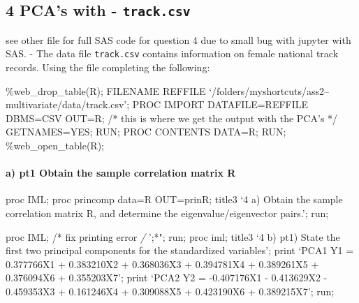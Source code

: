 \documentclass[11pt]{article}
\begin{document}
    \hypertarget{pcas-with---track.csv}{%
\subsection{\texorpdfstring{4 PCA's with -
\texttt{track.csv}}{4 PCA's with - track.csv}}\label{pcas-with---track.csv}}

see other file for full SAS code for question 4 due to small bug with
jupyter with SAS. - The data file \texttt{track.csv} contains
information on female national track records. Using the file completing
the following:

    \%web\_drop\_table(R); FILENAME REFFILE
`/folders/myshortcuts/ass2--multivariate/data/track.csv'; PROC IMPORT
DATAFILE=REFFILE DBMS=CSV OUT=R; /* this is where we get the output with
the PCA's */ GETNAMES=YES; RUN; PROC CONTENTS DATA=R; RUN;
\%web\_open\_table(R); 

    \hypertarget{a-pt1-obtain-the-sample-correlation-matrix-r}{%
\paragraph{a) pt1 Obtain the sample correlation matrix
R}\label{a-pt1-obtain-the-sample-correlation-matrix-r}}

     proc IML; proc princomp data=R OUT=prinR; title3 `4 a) Obtain the
sample correlation matrix R, and determine the eigenvalue/eigenvector
pairs.'; run;

proc IML; /* fix printing error \emph{/ }';*"; run; proc iml; title3 `4
b) pt1) State the first two principal components for the standardized
variables'; print `PCA1 Y1 = 0.377766X1 + 0.383210X2 + 0.368036X3 +
0.394781X4 + 0.389261X5 + 0.376094X6 + 0.355203X7'; print `PCA2 Y2 =
-0.407176X1 - 0.413629X2 - 0.459353X3 + 0.161246X4 + 0.309088X5 +
0.423190X6 + 0.389215X7'; run; 
\end{document}
